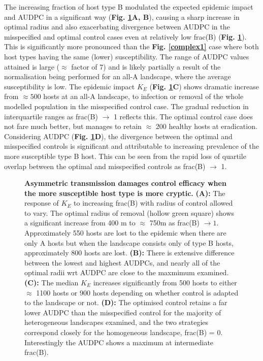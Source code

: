 \documentclass[11pt,letterpaper]{article}
\begin{document}
The increasing fraction of host type B modulated the expected epidemic impact and AUDPC in a significant way (\textbf{Fig. \ref{asymm}A, B}), causing a sharp increase in optimal radius and also exacerbating divergence between AUDPC in the misspecified and optimal control cases even at relatively low frac(B) (\textbf{Fig. \ref{asymm}}). This is significantly more pronounced than the \textbf{Fig. \ref{complex1}} case where both host types having the same (lower) susceptibility.  The range of AUDPC values attained is large ($\approx$ factor of 7) and is likely partially a result of the normalisation being performed for an all-A landscape, where the average susceptibility is low. The epidemic impact $K_E$ (\textbf{Fig. \ref{asymm}C}) shows dramatic increase from $\approx 500$ hosts at an all-A landscape, to infection or removal of the whole modelled population in the misspecified control case. The gradual reduction in interquartile ranges as frac(B) $\rightarrow$ 1 reflects this. The optimal control case does not fare much better, but manages to retain $\approx$ 200 healthy hosts at eradication. Considering AUDPC (\textbf{Fig. \ref{asymm}D}), the divergence between the optimal and misspecified controls is significant and attributable to increasing prevalence of the more susceptible type B host. This can be seen from the rapid loss of quartile overlap between the optimal and misspecified controls as frac(B) $\rightarrow$ 1. 
 \begin{figure}[h]
 	\centering
 	
 	\vspace{5mm}
 	\caption{\label{asymm} \textbf{Asymmetric transmission damages control efficacy when the more susceptible host type is more cryptic.} \textbf{(A):} The response of $K_E$ to increasing frac(B) with radius of control allowed to vary. The optimal radius of removal (hollow green square) shows a significant increase from 400 m to $\approx$ 750m as frac(B) $\rightarrow 1$. Approximately 550 hosts are lost to the epidemic when there are only A hosts but when the landscape consists only of type B hosts, approximately 800 hosts are lost. \textbf{(B):} There is extensive difference between the lowest and highest AUDPCs, and nearly all of the optimal radii wrt AUDPC are close to the maxmimum examined. \textbf{(C):} The median $K_E$ increases significantly from 500 hosts to either $\approx$  1100 hosts or 900 hosts depending on whether control is adapted to the landscape or not. \textbf{(D):} The optimised control retains a far lower AUDPC than the misspecified control for the majority of heterogeneous landscapes examined, and the two strategies correspond closely for the homogeneous landscape, frac(B) = 0. Interestingly the AUDPC shows a maximum at intermediate frac(B).}
\end{figure}
  
\end{document}
